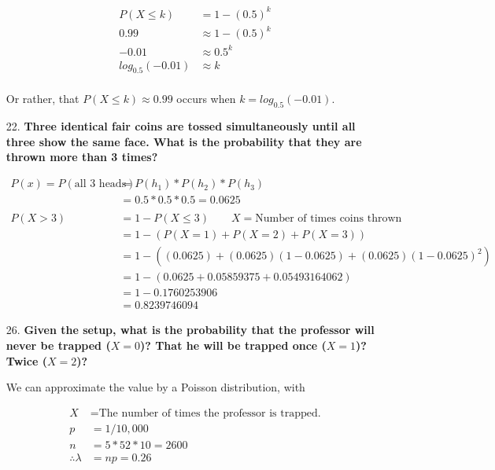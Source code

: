 \documentclass{article}
\begin{document}
\begin{enumerate}
				\begin{align*}
					P(X \le k) & = 1 - (0.5)^k \\
					0.99 & \approx 1 - (0.5)^k \\
					-0.01 & \approx 0.5^k \\
					log_{0.5}(-0.01) & \approx k \\
				\end{align*}

			Or rather, that $P(X \le k) \approx{} 0.99$ occurs when $k = log_{0.5}(-0.01)$.


		\item [22.]	\textbf{Three identical fair coins are tossed simultaneously until all three
						show the same face. What is the probability that they are thrown more than
						3 times?}
			
			\begin{align*}
				P(x) = P(\text{all 3 heads}) & = P(h_1) * P(h_2) * P(h_3) \\
					& = 0.5 * 0.5 * 0.5 = 0.0625\\
					\\
				P(X > 3) & = 1 - P(X \le 3) \qquad X = \text{Number of times coins thrown} \\
					& = 1 - (P(X = 1) + P(X = 2) + P(X = 3)) \\ 
					& = 1 - ((0.0625) + (0.0625)(1 - 0.0625) + (0.0625)(1 - 0.0625)^2) \\
					& = 1 - (0.0625 + 0.05859375 + 0.05493164062) \\
					& = 1 - 0.1760253906 \\
					& = 0.8239746094
			\end{align*}

		\item [26.] \textbf{Given the setup, what is the probability that the professor will never
						be trapped ($X = 0$)? That he will be trapped once ($X = 1$)? 
						Twice ($X = 2$)?}	

			We can approximate the value by a Poisson distribution, with 

				\begin{align*}
					X & = \text{The number of times the professor is trapped.} \\
					p & = 1 / 10,000 \\
					n & = 5 * 52 * 10 = 2600 \\
					\therefore \lambda & = np = 0.26 \\
				\end{align*}


\end{enumerate}
\end{document}
